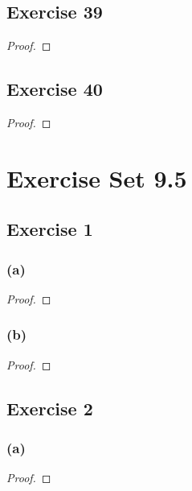 \documentclass[14pt]{extarticle}
\begin{document}
\subsection{Exercise 39}

\begin{proof}

\end{proof}

\subsection{Exercise 40}

\begin{proof}

\end{proof}

\section{Exercise Set 9.5}

\subsection{Exercise 1}

\subsubsection{(a)}

\begin{proof}

\end{proof}

\subsubsection{(b)}

\begin{proof}

\end{proof}

\subsection{Exercise 2}

\subsubsection{(a)}

\begin{proof}

\end{proof}
\end{document}
